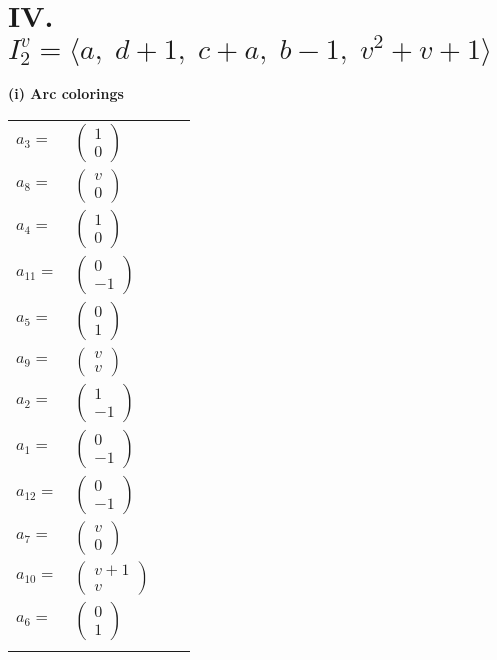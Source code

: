 \documentclass[1p]{elsarticle_modified}
\theoremstyle{definition}
\begin{document}
\centering \section*{IV. $I^v_{2}= \langle a,\;d+1,\;c+a,\;b-1,\;v^2+v+1 \rangle$}
\flushleft \textbf{(i) Arc colorings}\\
\begin{tabular}{m{7pt} m{180pt} m{7pt} m{180pt} }
\flushright $a_{3}=$&$\begin{pmatrix}1\\0\end{pmatrix}$ \\
\flushright $a_{8}=$&$\begin{pmatrix}v\\0\end{pmatrix}$ \\
\flushright $a_{4}=$&$\begin{pmatrix}1\\0\end{pmatrix}$ \\
\flushright $a_{11}=$&$\begin{pmatrix}0\\-1\end{pmatrix}$ \\
\flushright $a_{5}=$&$\begin{pmatrix}0\\1\end{pmatrix}$ \\
\flushright $a_{9}=$&$\begin{pmatrix}v\\v\end{pmatrix}$ \\
\flushright $a_{2}=$&$\begin{pmatrix}1\\-1\end{pmatrix}$ \\
\flushright $a_{1}=$&$\begin{pmatrix}0\\-1\end{pmatrix}$ \\
\flushright $a_{12}=$&$\begin{pmatrix}0\\-1\end{pmatrix}$ \\
\flushright $a_{7}=$&$\begin{pmatrix}v\\0\end{pmatrix}$ \\
\flushright $a_{10}=$&$\begin{pmatrix}v+1\\v\end{pmatrix}$ \\
\flushright $a_{6}=$&$\begin{pmatrix}0\\1\end{pmatrix}$\\&\end{tabular}
\end{document}
